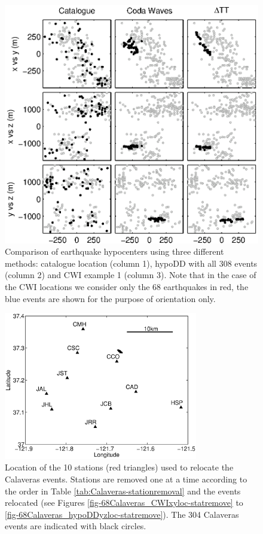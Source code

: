 \documentclass[draft,jgrga]{agutex}
\begin{document}
\begin{figure}
\includegraphics{diags/CalaverasLoc1.eps}
\caption{Comparison of earthquake hypocenters using three different methods: catalogue location (column 1), hypoDD with all
308 events (column 2) and CWI example 1 (column 3).
Note that in the case of the CWI locations we consider only the 68 earthquakes in red, the
blue events are shown for the purpose of orientation only.}
\label{fig-69Calaverasevents_eg1}
\end{figure}


\begin{figure}
\noindent\includegraphics[width = 20pc]{diags/CalaverasMap/matlab/Calaveras_substationmap}
\caption{Location of the 10 stations (red triangles) used to relocate the Calaveras events.
Stations are removed one at a time according to the order in Table \ref{tab:Calaveras-stationremoval} and the events
relocated (see Figures \ref{fig-68Calaveras_CWIxyloc-statremove} to \ref{fig-68Calaveras_hypoDDyzloc-statremove}).
The 304 Calaveras events are indicated with black circles.}
\label{fig:-eqopti-Calaveras-substations}
\end{figure}
\end{document}
